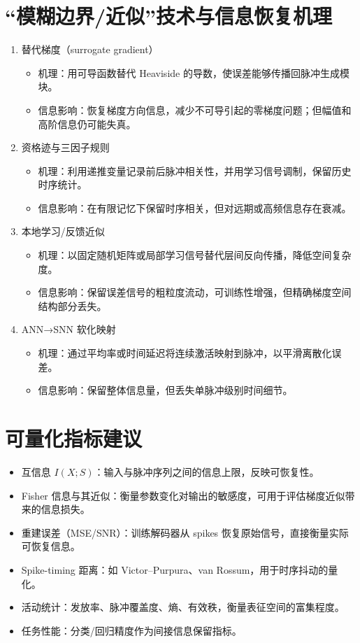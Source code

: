 \documentclass[journal,12pt,onecolumn]{IEEEtran}
\begin{document}
\section{“模糊边界/近似”技术与信息恢复机理}
\begin{enumerate}[leftmargin=*]
  \item 替代梯度（surrogate gradient）
  \begin{itemize}
    \item 机理：用可导函数替代 Heaviside 的导数，使误差能够传播回脉冲生成模块。\
    \item 信息影响：恢复梯度方向信息，减少不可导引起的零梯度问题；但幅值和高阶信息仍可能失真。\
  \end{itemize}
  \item 资格迹与三因子规则
  \begin{itemize}
    \item 机理：利用递推变量记录前后脉冲相关性，并用学习信号调制，保留历史时序统计。\
    \item 信息影响：在有限记忆下保留时序相关，但对远期或高频信息存在衰减。\
  \end{itemize}
  \item 本地学习/反馈近似
  \begin{itemize}
    \item 机理：以固定随机矩阵或局部学习信号替代层间反向传播，降低空间复杂度。\
    \item 信息影响：保留误差信号的粗粒度流动，可训练性增强，但精确梯度空间结构部分丢失。\
  \end{itemize}
  \item ANN→SNN 软化映射
  \begin{itemize}
    \item 机理：通过平均率或时间延迟将连续激活映射到脉冲，以平滑离散化误差。\
    \item 信息影响：保留整体信息量，但丢失单脉冲级别时间细节。\
  \end{itemize}
\end{enumerate}

\section{可量化指标建议}
\begin{itemize}
  \item 互信息 $I(X;S)$：输入与脉冲序列之间的信息上限，反映可恢复性。\
  \item Fisher 信息与其近似：衡量参数变化对输出的敏感度，可用于评估梯度近似带来的信息损失。\
  \item 重建误差（MSE/SNR）：训练解码器从 spikes 恢复原始信号，直接衡量实际可恢复信息。\
  \item Spike-timing 距离：如 Victor--Purpura、van Rossum，用于时序抖动的量化。\
  \item 活动统计：发放率、脉冲覆盖度、熵、有效秩，衡量表征空间的富集程度。\
  \item 任务性能：分类/回归精度作为间接信息保留指标。\
\end{itemize}
\end{document}
